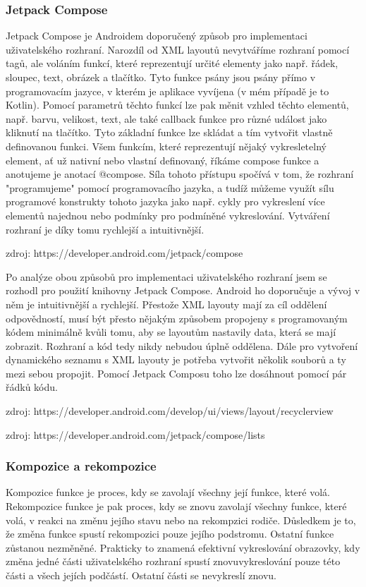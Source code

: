 \subsubsection*{Jetpack Compose}
Jetpack Compose je Androidem doporučený způsob pro implementaci uživatelského rozhraní. Narozdíl od XML layoutů nevytváříme rozhraní pomocí tagů, ale voláním funkcí, které reprezentují určité elementy jako např. řádek, sloupec, text, obrázek a tlačítko. Tyto funkce psány jsou psány přímo v programovacím jazyce, v kterém je aplikace vyvíjena (v mém případě je to Kotlin). Pomocí parametrů těchto funkcí lze pak měnit vzhled těchto elementů, např. barvu, velikost, text, ale také callback funkce pro různé událost jako kliknutí na tlačítko. Tyto základní funkce lze skládat a tím vytvořit vlastně definovanou funkci. Všem funkcím, které reprezentují nějaký vykresletelný element, ať už nativní nebo vlastní definovaný, říkáme compose funkce a anotujeme je anotací @compose.  Síla tohoto přístupu spočívá v tom, že rozhraní "programujeme" pomocí programovacího jazyka, a tudíž můžeme využít sílu programové konstrukty tohoto jazyka jako např. cykly pro vykreslení více elementů najednou nebo podmínky pro podmíněné vykreslování. Vytváření rozhraní je díky tomu rychlejší a intuitivnější.

zdroj: https://developer.android.com/jetpack/compose

\vspace*{10px}
\noindent Po analýze obou způsobů pro implementaci uživatelského rozhraní jsem se rozhodl pro použití knihovny Jetpack Compose. Android ho doporučuje a vývoj v něm je intuitivnější a rychlejší. Přestože XML layouty mají za cíl oddělení odpovědností, musí být přesto nějakým způsobem propojeny s programovaným kódem minimálně kvůli tomu, aby se layoutům nastavily data, která se mají zobrazit. Rozhraní a kód tedy nikdy nebudou úplně oddělena. Dále pro vytvoření dynamického seznamu s XML layouty je potřeba vytvořit několik souborů a ty mezi sebou propojit. Pomocí Jetpack Composu toho lze dosáhnout pomocí pár řádků kódu.

\vspace*{10px}
\noindent zdroj: https://developer.android.com/develop/ui/views/layout/recyclerview

\noindent zdroj: https://developer.android.com/jetpack/compose/lists

\vspace*{10px}

\subsubsection*{Kompozice a rekompozice}
Kompozice funkce je proces, kdy se zavolají všechny její funkce, které volá. Rekompozice funkce je pak proces, kdy se znovu zavolají všechny funkce, které volá, v reakci na změnu jejího stavu nebo na rekompzici rodiče. Důsledkem je to, že změna funkce spustí  rekompozici pouze jejího podstromu. Ostatní funkce zůstanou nezměněné. Prakticky to znamená efektivní vykreslování obrazovky, kdy změna jedné části uživatelského rozhraní spustí znovuvykreslování pouze této části a všech jejích podčástí. Ostatní části se nevykreslí znovu.

